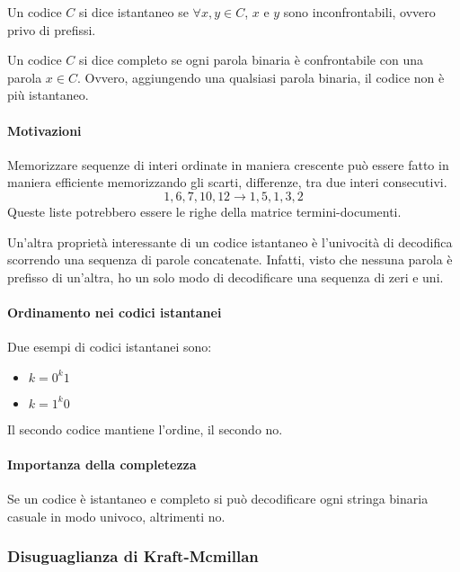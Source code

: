 \begin{definition}
    Un codice $C$ si dice istantaneo se $\forall x,y \in C$, $x$ e $y$ sono inconfrontabili, ovvero privo di prefissi.
\end{definition}

\begin{definition}
    Un codice $C$ si dice completo se ogni parola binaria è confrontabile 
    con una parola $x \in C$. Ovvero, aggiungendo una qualsiasi parola binaria, 
    il codice non è più istantaneo.
\end{definition}

\paragraph{Motivazioni}
Memorizzare sequenze di interi ordinate in maniera crescente può essere fatto in maniera
efficiente memorizzando gli scarti, differenze, tra due interi consecutivi.
$$1, 6, 7, 10, 12 \longrightarrow 1, 5, 1, 3, 2$$
Queste liste potrebbero essere le righe della matrice termini-documenti.

Un'altra proprietà interessante di un codice istantaneo è l'univocità di decodifica 
scorrendo una sequenza di parole concatenate. 
Infatti, visto che nessuna parola è prefisso di un'altra, ho un solo modo di decodificare una 
sequenza di zeri e uni.

\paragraph{Ordinamento nei codici istantanei}
Due esempi di codici istantanei sono:
\begin{itemize}
    \item $k = 0^k1$
    \item $k = 1^k0$
\end{itemize}
Il secondo codice mantiene l'ordine, il secondo no.

\paragraph{Importanza della completezza}
Se un codice è istantaneo e completo si può decodificare ogni stringa binaria 
casuale in modo univoco, altrimenti no.

\subsubsection{Disuguaglianza di Kraft-Mcmillan}

